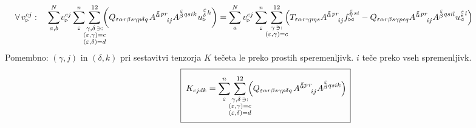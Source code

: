 \begin{equation}
   \hspace{-18mm}
   \forall \, v^{c j}_{\triangleright}: \quad
   \sum^N_{a,b} \mkern-2mu v^{c  j}_{\triangleright}
   \sum^n_\varepsilon
   \mkern-7mu
   \sum_{\substack{\gamma, \delta \, \ni: \\
      (\varepsilon,\gamma) = c \\ (\varepsilon,\delta) = d}}^{12}
   \mkern-10mu
   \qty(
   Q_{\varepsilon   \alpha r   \beta s   \gamma p   \delta q} \mkern2mu
   A^{\substack{\mkern2mu \varepsilon \\[-0.65mm] \alpha} \mkern2mu p r}_{\mkern29mu i j}
   A^{\substack{\mkern2mu \varepsilon \\[0.05mm] \beta} \mkern2mu q s i k} \mkern1mu
   u^{\substack{\mkern2mu \varepsilon \\[0.09mm] \delta} \mkern2mu k}_\triangleright )
   =
   \sum^N_a v^{c j}_{\triangleright}
   \sum^n_\varepsilon
   \mkern-7mu
   \sum_{\substack{\gamma \, \ni: \\ (\varepsilon,\gamma) = c}}^{12}
   \mkern-10mu
   \qty(
   T_{\varepsilon   \alpha r   \gamma p   \eta s}
   A^{\substack{\mkern2mu \varepsilon \\[-0.65mm] \alpha} \mkern2mu p r}_{\mkern29mu i j}
   f^{\substack{\mkern2mu \varepsilon \\[-0.59mm] \eta} \mkern2mu s i}_{\bowtie}
   -
   Q_{\varepsilon   \alpha r   \beta s   \gamma p   \epsilon q}
   A^{\substack{\mkern2mu \varepsilon \\[-0.65mm] \alpha} \mkern2mu p r}_{\mkern29mu i j}
   A^{\substack{\mkern2mu \varepsilon \\[0.05mm] \beta} \mkern2mu q s i l}
   u^{\substack{\mkern2mu \varepsilon \\[-0.55mm] \epsilon} \mkern2mu l}_\triangleleft )
\end{equation}
Pomembno: $(\gamma, j)$ in $(\delta, k)$ pri sestavitvi tenzorja $K$ tečeta le preko prostih speremenljivk. $i$ teče preko vseh spremenljivk.
\begin{equation}
   \boxed{ \phantom{\rule[-12mm]{1mm}{20mm}}
   K_{cjdk} =
   \sum^n_\varepsilon
   \mkern-7mu
   \sum_{\substack{\gamma, \delta \, \ni: \\
      (\varepsilon,\gamma) = c \\ (\varepsilon,\delta) = d}}^{12}
   \mkern-10mu
   \qty(
   Q_{\varepsilon   \alpha r   \beta s   \gamma p   \delta q} \mkern2mu
   A^{\substack{\mkern2mu \varepsilon \\[-0.65mm] \alpha} p \mkern2mu r}_{\mkern29mu i j}
   A^{\substack{\mkern2mu \varepsilon \\[0.05mm] \beta} \mkern2mu  q s i k} ) \mkern3mu }
\end{equation}
